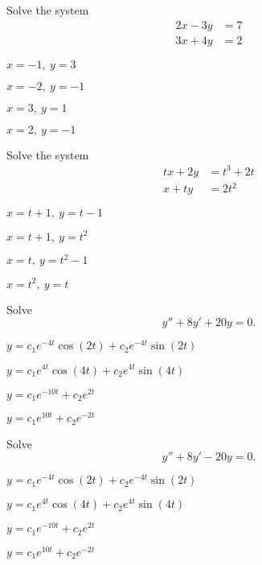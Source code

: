 \begin{readinessAssuranceTest}
\setcounter{enumi}{20}

\item
Solve the system 
\begin{alignat*}{2}
2x-3y&= 7 \\
3x+4y&= 2
\end{alignat*}
\begin{multicols}{4}
\begin{readinessAssuranceTestChoices}
\item \(x=-1,\ y=3\)
\item \(x=-2,\ y=-1\)
\item \(x=3,\ y=1\)
\item \(x=2,\ y=-1\) %
\end{readinessAssuranceTestChoices}
\end{multicols}
\vfill

\item
Solve the system
\begin{alignat*}{2}
tx+2y&=t^3+2t \\
x+ty&= 2t^2
\end{alignat*}
\begin{multicols}{4}
\begin{readinessAssuranceTestChoices}
\item \(x=t+1,\ y=t-1\)
\item \(x=t+1,\ y=t^2\)
\item \(x=t,\ y=t^2-1\)
\item \(x=t^2,\ y=t\) %
\end{readinessAssuranceTestChoices}
\end{multicols}
\vfill

\item
Solve \[y''+8y'+20y = 0.\]
\begin{multicols}{2}
\begin{readinessAssuranceTestChoices}
\item \(y=c_1 e^{-4t}\cos(2t)+c_2e^{-4t}\sin(2t)\) %
\item \(y=c_1 e^{4t}\cos(4t)+c_2e^{4t}\sin(4t)\) 
\item \(y=c_1 e^{-10t}+c_2 e^{2t}\)
\item \(y=c_1 e^{10t}+c_2 e^{-2t}\)
\end{readinessAssuranceTestChoices}
\end{multicols}
\vfill
\item
Solve \[y''+8y'-20y= 0.\]
\begin{multicols}{2}
\begin{readinessAssuranceTestChoices}
\item \(y=c_1 e^{-4t}\cos(2t)+c_2e^{-4t}\sin(2t)\) 
\item \(y=c_1 e^{4t}\cos(4t)+c_2e^{4t}\sin(4t)\) 
\item \(y=c_1 e^{-10t}+c_2 e^{2t}\)%
\item \(y=c_1 e^{10t}+c_2 e^{-2t}\)
\end{readinessAssuranceTestChoices}
\end{multicols}


\end{readinessAssuranceTest}
